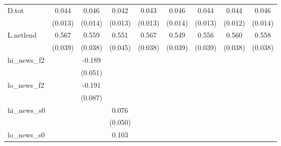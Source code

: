 {\begin{tabular}{l*{8}{c}}
D.tot       &       0.044\sym{***}&       0.046\sym{***}&       0.042\sym{***}&       0.043\sym{***}&       0.046\sym{***}&       0.044\sym{***}&       0.044\sym{***}&       0.046\sym{***}\\
            &     (0.013)         &     (0.014)         &     (0.013)         &     (0.013)         &     (0.014)         &     (0.013)         &     (0.012)         &     (0.014)         \\
\addlinespace
L.netlend   &       0.567\sym{***}&       0.559\sym{***}&       0.551\sym{***}&       0.567\sym{***}&       0.549\sym{***}&       0.556\sym{***}&       0.560\sym{***}&       0.558\sym{***}\\
            &     (0.039)         &     (0.038)         &     (0.045)         &     (0.038)         &     (0.039)         &     (0.039)         &     (0.038)         &     (0.038)         \\
\addlinespace
hi\_news\_f2  &                     &      -0.189\sym{***}&                     &                     &                     &                     &                     &                     \\
            &                     &     (0.051)         &                     &                     &                     &                     &                     &                     \\
\addlinespace
lo\_news\_f2  &                     &      -0.191\sym{**} &                     &                     &                     &                     &                     &                     \\
            &                     &     (0.087)         &                     &                     &                     &                     &                     &                     \\
\addlinespace
hi\_news\_s0  &                     &                     &       0.076         &                     &                     &                     &                     &                     \\
            &                     &                     &     (0.050)         &                     &                     &                     &                     &                     \\
\addlinespace
lo\_news\_s0  &                     &                     &       0.103\sym{*}  &                     &                     &                     &                     &                     \\

\end{tabular}}

